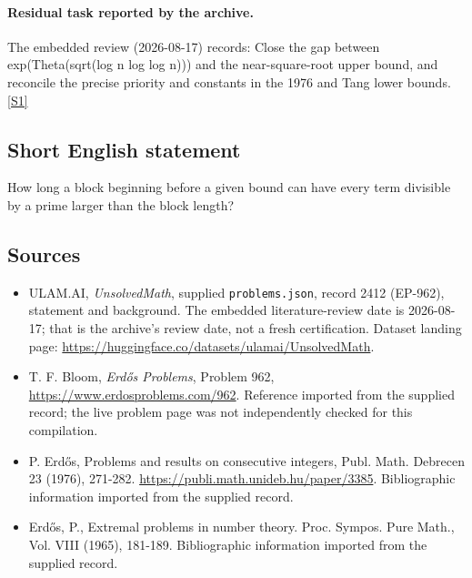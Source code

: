 \documentclass[11pt,a4paper]{article}
\newcommand{\sref}[2]{\hyperlink{source:#1:#2}{[S#2]}}
\begin{document}
\paragraph{Residual task reported by the archive.}

The embedded review (2026-08-17) records: Close the gap between exp(Theta(sqrt(log n log log n))) and the near-square-root upper bound, and reconcile the precise priority and constants in the 1976 and Tang lower bounds. \sref{2412}{1}

\subsection{Short English statement}

How long a block beginning before a given bound can have every term divisible by a prime larger than the block length?

\subsection{Sources}

{\small

\begin{itemize}

\item[\hypertarget{source:2412:1}{S1}] ULAM.AI, \emph{UnsolvedMath}, supplied \texttt{problems.json}, record 2412 (EP-962), statement and background. The embedded literature-review date is 2026-08-17; that is the archive’s review date, not a fresh certification. Dataset landing page: \url{https://huggingface.co/datasets/ulamai/UnsolvedMath}.

\item[\hypertarget{source:2412:2}{S2}] T. F. Bloom, \emph{Erdős Problems}, Problem 962, \url{https://www.erdosproblems.com/962}. Reference imported from the supplied record; the live problem page was not independently checked for this compilation.

\item[\hypertarget{source:2412:3}{S3}] P. Erdős, Problems and results on consecutive integers, Publ. Math. Debrecen 23 (1976), 271-282. \url{https://publi.math.unideb.hu/paper/3385}. Bibliographic information imported from the supplied record.

\item[\hypertarget{source:2412:4}{S4}] Erd\H{o}s, P., Extremal problems in number theory. Proc. Sympos. Pure Math., Vol. VIII (1965), 181-189. Bibliographic information imported from the supplied record.

\end{itemize}

}

\label{end:2412}
\end{document}
